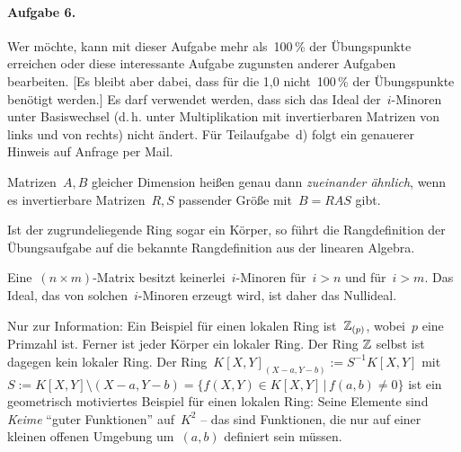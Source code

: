 \documentclass{algblatt}
\newcommand{\hint}[1]{\rotatebox{180}{\vbox{\textcolor{grey}{#1}}}}
\begin{document}
\hint{%
Lemma: Ein Element~$x \in R$ ist genau dann in~$R[f^{-1}]$ invertierbar, wenn~$x$ ein
Teiler einer gewissen Potenz~$f^n$, $n \geq 0$, ist. (Wieso?)}


\paragraph{Aufgabe 6.} Wer möchte, kann mit dieser Aufgabe mehr als~100\,\% der
Übungspunkte erreichen oder diese interessante Aufgabe zugunsten anderer
Aufgaben bearbeiten. [Es bleibt aber dabei, dass für die 1,0 nicht~100\,\% der
Übungspunkte benötigt werden.] Es darf verwendet werden, dass sich das Ideal
der~$i$-Minoren unter Basiswechsel (d.\,h. unter Multiplikation mit
invertierbaren Matrizen von links und von rechts) nicht ändert. Für
Teilaufgabe~d) folgt ein genauerer Hinweis auf Anfrage per Mail.

Matrizen~$A, B$ gleicher Dimension heißen genau dann \emph{zueinander ähnlich},
wenn es invertierbare Matrizen~$R, S$ passender Größe mit~$B = R A S$ gibt.

Ist der zugrundeliegende Ring sogar ein Körper, so führt die Rangdefinition der
Übungs\-auf\-ga\-be auf die bekannte Rangdefinition aus der linearen Algebra.

Eine~$(n \times m)$-Matrix besitzt keinerlei~$i$-Minoren für~$i > n$ und für~$i
> m$. Das Ideal, das von solchen~$i$-Minoren erzeugt wird, ist daher das
Nullideal.

Nur zur Information: Ein Beispiel für einen lokalen Ring ist~$\mathbb{Z}_{(p)}$,
wobei~$p$ eine Primzahl ist. Ferner ist jeder Körper ein lokaler Ring. Der Ring
$\mathbb{Z}$ selbst ist dagegen kein lokaler Ring. Der Ring~$K[X,Y]_{(X-a,Y-b)} :=
S^{-1}K[X,Y]$ mit~$S := K[X,Y] \setminus (X-a,Y-b) = \{ f(X,Y) \in K[X,Y]
\,|\, f(a,b) \neq 0 \}$ ist ein geometrisch motiviertes Beispiel für einen
lokalen Ring: Seine Elemente sind \emph{Keime} "`guter Funktionen"' auf~$K^2$
-- das sind Funktionen, die nur auf einer kleinen offenen Umgebung um~$(a,b)$ definiert
sein müssen.

\hint{%
Für Teilaufgabe~c) muss man mit verschachtelten Zerlegungen der Eins umgehen.
Ich möchte nicht, dass ihr euch in lauter Technik verliert -- im Digicampus ist
ein allgemeines Lemma festgehalten, dass ihr verwenden könnt.
}

\hint{%
Zu Teilaufgabe~b): Der Fall~$r = 0$ lässt sich kurz erledigen, wieso? Im Fall~$r = 1$
ist mindestens ein Matrixeintrag invertierbar (wieso?). Diesen kann man dann
mit elementaren Zeilen- und Spaltenumformungen nach oben links bringen
(wieso?). Wie geht es dann weiter? Vielleicht ist folgende allgemeine
Beobachtung nützlich: Wenn das von den~$i$-Minoren erzeugte Ideal das Einsideal
ist, so ist für alle~$j < i$ auch das von den~$j$-Minoren erzeugte Ideal das
Einsideal ist.}
\end{document}
